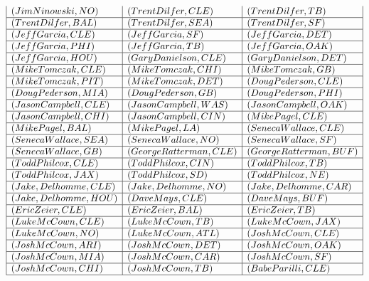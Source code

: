 \documentclass{ximera}
\begin{document}
\begin{center}
\[\begin{array}{|l|l|l|}
(Jim Ninowski, NO) & (Trent Dilfer, CLE) & (Trent Dilfer, TB) \\\hline  
(Trent Dilfer, BAL) &  (Trent Dilfer, SEA) &  (Trent Dilfer, SF) \\\hline 
(Jeff Garcia, CLE) & (Jeff Garcia, SF) & (Jeff Garcia, DET) \\\hline 
(Jeff Garcia, PHI) & (Jeff Garcia, TB) & (Jeff Garcia, OAK) \\\hline 
(Jeff Garcia, HOU) & (Gary Danielson, CLE) & (Gary Danielson, DET) \\\hline 
(Mike Tomczak, CLE) & (Mike Tomczak, CHI) & (Mike Tomczak, GB) \\\hline 
(Mike Tomczak, PIT) & (Mike Tomczak, DET) & (Doug Pederson, CLE) \\\hline 
(Doug Pederson, MIA) & (Doug Pederson, GB) & (Doug Pederson, PHI) \\\hline 
(Jason Campbell, CLE) & (Jason Campbell, WAS) & (Jason Campbell, OAK) \\\hline 
(Jason Campbell, CHI) & (Jason Campbell, CIN) & (Mike Pagel, CLE) \\\hline 
(Mike Pagel, BAL) & (Mike Pagel, LA) & (Seneca Wallace, CLE) \\\hline 
(Seneca Wallace, SEA) &  (Seneca Wallace, NO) &  (Seneca Wallace, SF) \\\hline  
(Seneca Wallace, GB) & (George Ratterman, CLE) & (George Ratterman, BUF) \\\hline 
(Todd Philcox, CLE) & (Todd Philcox, CIN) & (Todd Philcox, TB) \\\hline 
(Todd Philcox, JAX) & (Todd Philcox, SD) & (Todd Philcox, NE) \\\hline 
(Jake, Delhomme, CLE) & (Jake, Delhomme, NO) & (Jake, Delhomme, CAR) \\\hline 
(Jake, Delhomme, HOU) & (Dave Mays, CLE) & (Dave Mays, BUF) \\\hline 
(Eric Zeier, CLE) & (Eric Zeier, BAL) & (Eric Zeier, TB) \\\hline 
(Luke McCown, CLE) & (Luke McCown, TB) & (Luke McCown, JAX) \\\hline 
(Luke McCown, NO) & (Luke McCown, ATL) & (Josh McCown, CLE) \\\hline 
(Josh McCown, ARI) & (Josh McCown, DET) & (Josh McCown, OAK) \\\hline 
(Josh McCown, MIA) & (Josh McCown, CAR) & (Josh McCown, SF) \\\hline 
(Josh McCown, CHI) & (Josh McCown, TB) & (Babe Parilli, CLE) \\\hline 

\end{array}\]
\end{center}
\end{document}
